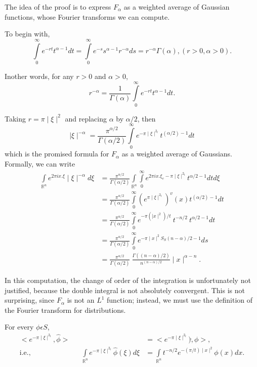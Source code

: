 \setcounter{proof of theorem}{18}
\begin{proof of theorem} %
   The idea of the proof is to express $F _ {\alpha}$ as a weighted
   average of Gaussian functions, whose Fourier transforms we can
   compute. 

   To begin with,
   $$
   \int\limits_{0}^{\infty} e^{-rt} t^{\alpha-1} dt =
   \int\limits_{0}^{\infty} e ^{-s}s^{\alpha -1} r^{-\alpha} ds= r^{-
   \alpha}\Gamma( \alpha), (r > 0, \alpha > 0 ). 
   $$
\end{proof of theorem} 

In\pageoriginale other words, for any $r > 0$ and $\alpha > 0$,
$$
r^{-\alpha} = \frac{1}{\Gamma(\alpha)} \int\limits^{\infty}_{0}
e^{-rt} t^{\alpha -1} dt. 
$$

Taking $r = \pi \mid \xi \mid ^2$ and replacing $\alpha$ by $\alpha /2$, then
$$
\mid \xi \mid ^{-\alpha}= \frac{\pi^{\alpha/2}}{\Gamma (\alpha/2)}
\int\limits^{\infty}_{0} e^{-\pi \mid \xi \mid ^{2_t}} t^{(\alpha
  /2)-1} dt  
$$
which is the promised formula for $F_\alpha$ as a weighted average of
Gaussians. Formally, we can write 
\begin{align*}
  \int\limits_{\mathbb{R}^n} e^{2\pi i x. \xi}\mid \xi \mid^{-\alpha} d
      \xi  &= \frac{\pi^{\alpha/2}}{\Gamma (\alpha/2)}
 \int\limits_{\mathbb{R}^n} \int\limits^{\infty}_{0} e^{2\pi ix. \xi_e
  -\pi \mid \xi \mid^{2_t}} t^{\alpha/2-1} {dt} d \xi\\ 
 &= \frac{\pi^{\alpha/2}}{\Gamma (\alpha/2)} \int\limits^{\infty}_{0}
 (e^{\pi\mid \xi \mid^{2_t}})^v (x) t^{(\alpha/2)-1} dt\\ 
 &= \frac{\pi^{\alpha/2}}{\Gamma (\alpha/2)} \int\limits^{\infty}_{0}
 e^{-\pi (\mid x \mid^2) /t}~ t^{-n/2 } ~t^{\alpha / 2-1} dt\\ 
 &=\frac{\pi^{\alpha/2}}{\Gamma (\alpha/2)} \int\limits^{\infty}_{0}
 e^{-\pi \mid x \mid ^2 S_S (n-\alpha)/2-1} ds\\ 
 &= \frac {\pi^{\alpha/2}}{\Gamma (\alpha/2)} ~ \frac{\Gamma
   ((n-\alpha)/2)}{n^{(n-\alpha)/2}} \mid x \mid ^{\alpha-n}. 
\end{align*}

In this computation, the change of order of the integration is
unfortunately not justified, because the double integral is not
absolutely convergent. This is not surprising, since $F_\alpha$ is not
an $L^1$ function; instead, we must use the definition of the Fourier
transform for distributions. 

For every $\phi \epsilon S$,
\begin{align*}
  < e^{-\pi \mid \xi \mid^{2_t}}, \hat{\phi} > & = < e^{-\pi \mid \xi \mid
    ^{2_t}} )\hat, \phi >,\\ 
  \text{i.e.,} \hspace{3cm} \int\limits_{\mathbb{R}^n} e^{-\pi \mid \xi \mid ^{2_t}}
  \hat{\phi}(\xi)d\xi &= \int\limits_{\mathbb{R}^n} t^{-n/2} e^{-( \pi /
    t )\mid x \mid ^2} \phi (x) dx.
\end{align*}\pageoriginale

